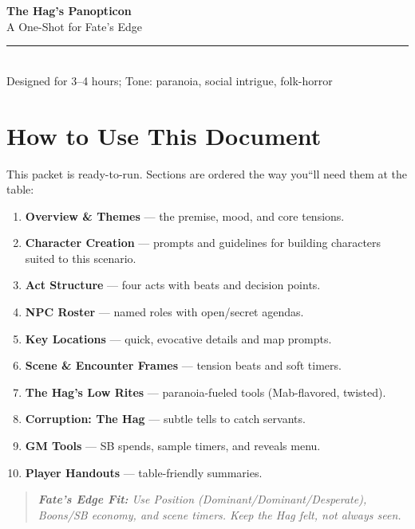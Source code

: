 \documentclass[11pt]{article}
\newenvironment{callout}
{\begin{quote}\itshape\small\color{gray!40!black}}
{\end{quote}}
\begin{document}



\begin{center}
  {\huge \textbf{The Hag's Panopticon}}\\[6pt]
  {\large A One-Shot for Fate's Edge}\\[12pt]
  \rule{0.7\linewidth}{0.4pt}\\[8pt]
  {\small Designed for 3--4 hours; Tone: paranoia, social intrigue, folk-horror}\\
\end{center}

\vspace{1em}
\tableofcontents
\newpage

\section{How to Use This Document}
This packet is ready-to-run. Sections are ordered the way you``ll need them at the table:
\begin{enumerate}
  \item \textbf{Overview \& Themes} --- the premise, mood, and core tensions.
  \item \textbf{Character Creation} --- prompts and guidelines for building characters suited to this scenario.
  \item \textbf{Act Structure} --- four acts with beats and decision points.
  \item \textbf{NPC Roster} --- named roles with open/secret agendas.
  \item \textbf{Key Locations} --- quick, evocative details and map prompts.
  \item \textbf{Scene \& Encounter Frames} --- tension beats and soft timers.
  \item \textbf{The Hag's Low Rites} --- paranoia-fueled tools (Mab-flavored, twisted).
  \item \textbf{Corruption: The Hag} --- subtle tells to catch servants.
  \item \textbf{GM Tools} --- SB spends, sample timers, and reveals menu.
  \item \textbf{Player Handouts} --- table-friendly summaries.
\end{enumerate}

\begin{callout}
\textbf{Fate's Edge Fit:} Use Position (Dominant/Dominant/Desperate), Boons/SB economy, and scene timers. Keep the Hag \emph{felt}, not always \emph{seen}.
\end{callout}
\end{document}
